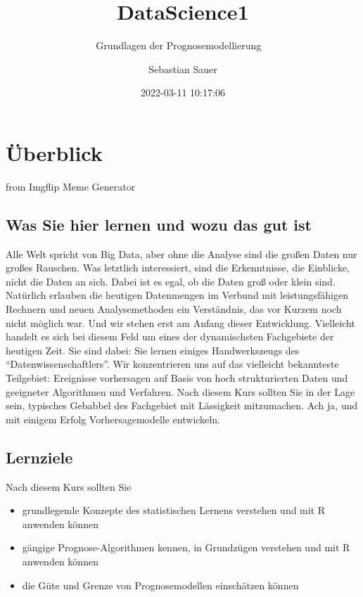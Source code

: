 \documentclass[
]{book}
\title{DataScience1}
\subtitle{Grundlagen der Prognosemodellierung 🔮🧰}
\author{Sebastian Sauer}
\date{2022-03-11 10:17:06}
\providecommand{\tightlist}{%
  \setlength{\itemsep}{0pt}\setlength{\parskip}{0pt}}
\begin{document}
\maketitle

{
\setcounter{tocdepth}{1}
\tableofcontents
}
\hypertarget{uxfcberblick}{%
\chapter{Überblick}\label{uxfcberblick}}

from Imgflip Meme Generator

\hypertarget{was-sie-hier-lernen-und-wozu-das-gut-ist}{%
\section{Was Sie hier lernen und wozu das gut ist}\label{was-sie-hier-lernen-und-wozu-das-gut-ist}}

Alle Welt spricht von Big Data, aber ohne die Analyse sind die großen Daten nur großes Rauschen. Was letztlich interessiert, sind die Erkenntnisse, die Einblicke, nicht die Daten an sich.
Dabei ist es egal, ob die Daten groß oder klein sind.
Natürlich erlauben die heutigen Datenmengen im Verbund mit leistungsfähigen Rechnern und neuen Analysemethoden ein Verständnis,
das vor Kurzem noch nicht möglich war.
Und wir stehen erst am Anfang dieser Entwicklung.
Vielleicht handelt es sich bei diesem Feld um eines der dynamischsten Fachgebiete der heutigen Zeit.
Sie sind dabei: Sie lernen einiges Handwerkszeugs des ``Datenwissenschaftlers''.
Wir konzentrieren uns auf das vielleicht bekannteste Teilgebiet:
Ereignisse vorhersagen auf Basis von hoch strukturierten Daten
und geeigneter Algorithmen und Verfahren.
Nach diesem Kurs sollten Sie in der Lage sein,
typisches Gebabbel des Fachgebiet mit Lässigkeit mitzumachen.
Ach ja, und mit einigem Erfolg Vorhersagemodelle entwickeln.

\hypertarget{lernziele}{%
\section{Lernziele}\label{lernziele}}

Nach diesem Kurs sollten Sie

\begin{itemize}
\tightlist
\item
  grundlegende Konzepte des statistischen Lernens verstehen und mit R anwenden können
\item
  gängige Prognose-Algorithmen kennen, in Grundzügen verstehen und mit R anwenden können
\item
  die Güte und Grenze von Prognosemodellen einschätzen können
\end{itemize}
\end{document}
